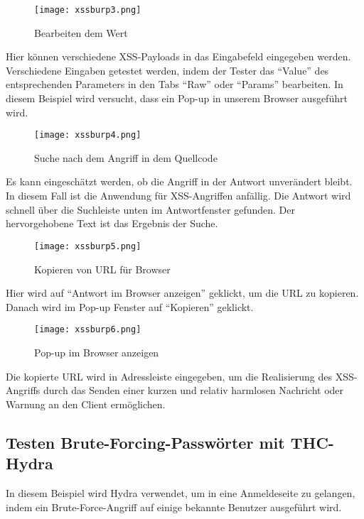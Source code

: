 \begin{figure}[h]
	\centering
	\texttt{[image: xssburp3.png]}
	\caption{Bearbeiten dem Wert}
\end{figure}

Hier können verschiedene XSS-Payloads in das Eingabefeld eingegeben werden. Verschiedene Eingaben getestet werden, indem der Tester das "`Value"' des entsprechenden Parameters in den Tabs "`Raw"' oder "`Params"' bearbeiten. In diesem Beispiel wird versucht, dass ein Pop-up in unserem Browser ausgeführt wird.

\newpage

\begin{figure}[h]
	\centering
	\texttt{[image: xssburp4.png]}
	\caption{Suche nach dem Angriff in dem Quellcode}
\end{figure}

Es kann eingeschätzt werden, ob die Angriff in der Antwort unverändert bleibt. In diesem Fall ist die Anwendung für XSS-Angriffen anfällig. Die Antwort wird schnell über die Suchleiste unten im Antwortfenster gefunden. Der hervorgehobene Text ist das Ergebnis der Suche.

\begin{figure}[h]
	\centering
	\texttt{[image: xssburp5.png]}
	\caption{Kopieren von URL für Browser}
\end{figure}

Hier wird auf "`Antwort im Browser anzeigen"' geklickt, um die URL zu kopieren. Danach wird im Pop-up Fenster auf "`Kopieren"' geklickt.

\newpage

\begin{figure}[h]
	\centering
	\texttt{[image: xssburp6.png]}
	\caption{Pop-up im Browser anzeigen}
\end{figure}

Die kopierte URL wird in Adressleiste eingegeben, um die Realisierung des XSS-Angriffs durch das Senden einer kurzen und relativ harmlosen Nachricht oder Warnung an den Client ermöglichen.

\subsection{Testen Brute-Forcing-Passwörter mit THC-Hydra}

In diesem Beispiel wird Hydra verwendet, um in eine Anmeldeseite zu gelangen, indem ein Brute-Force-Angriff auf einige bekannte Benutzer ausgeführt wird\cite[143]{najera2016kali}.

